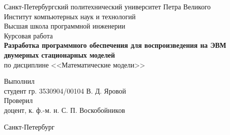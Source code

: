 \begin{titlepage}

  \begin{center}
    Санкт-Петербургский политехнический университет Петра Великого\\
    Институт компьютерных наук и технологий\\
    Высшая школа программной инженерии\\[8cm]

    {\LARGE Курсовая работа}\\[0.5cm]
    \noindent\textbf{Разработка программного обеспечения для воспроизведения на ЭВМ двумерных стационарных моделей}\\[0.1cm]
    \noindent по дисциплине <<Математические модели>>\\[3cm]
  \end{center}

    \noindent Выполнил\\
    \noindent студент гр. 3530904/00104 \hfill В. Д. Яровой\\

    \noindent Проверил\\
    \noindent доцент, к. ф.-м. н. \hfill С. П. Воскобойников

  \vfill

  \begin{center}
    Санкт-Петербург\\
    \the\year
  \end{center}

\end{titlepage}
